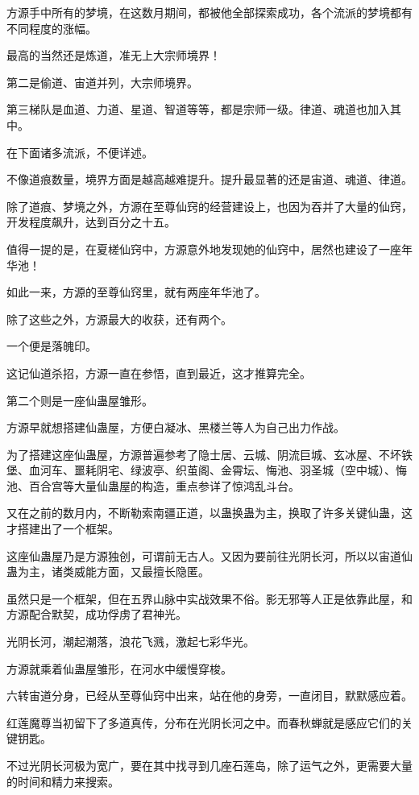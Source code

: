 \begin{this_body}
方源手中所有的梦境，在这数月期间，都被他全部探索成功，各个流派的梦境都有不同程度的涨幅。

最高的当然还是炼道，准无上大宗师境界！

第二是偷道、宙道并列，大宗师境界。

第三梯队是血道、力道、星道、智道等等，都是宗师一级。律道、魂道也加入其中。

在下面诸多流派，不便详述。

不像道痕数量，境界方面是越高越难提升。提升最显著的还是宙道、魂道、律道。

除了道痕、梦境之外，方源在至尊仙窍的经营建设上，也因为吞并了大量的仙窍，开发程度飙升，达到百分之十五。

值得一提的是，在夏槎仙窍中，方源意外地发现她的仙窍中，居然也建设了一座年华池！

如此一来，方源的至尊仙窍里，就有两座年华池了。

除了这些之外，方源最大的收获，还有两个。

一个便是落魄印。

这记仙道杀招，方源一直在参悟，直到最近，这才推算完全。

第二个则是一座仙蛊屋雏形。

方源早就想搭建仙蛊屋，方便白凝冰、黑楼兰等人为自己出力作战。

为了搭建这座仙蛊屋，方源普遍参考了隐士居、云城、阴流巨城、玄冰屋、不坏铁堡、血河车、噩耗阴宅、绿波亭、织茧阁、金霄坛、悔池、羽圣城（空中城）、悔池、百合宫等大量仙蛊屋的构造，重点参详了惊鸿乱斗台。

又在之前的数月内，不断勒索南疆正道，以蛊换蛊为主，换取了许多关键仙蛊，这才搭建出了一个框架。

这座仙蛊屋乃是方源独创，可谓前无古人。又因为要前往光阴长河，所以以宙道仙蛊为主，诸类威能方面，又最擅长隐匿。

虽然只是一个框架，但在五界山脉中实战效果不俗。影无邪等人正是依靠此屋，和方源配合默契，成功俘虏了君神光。

光阴长河，潮起潮落，浪花飞溅，激起七彩华光。

方源就乘着仙蛊屋雏形，在河水中缓慢穿梭。

六转宙道分身，已经从至尊仙窍中出来，站在他的身旁，一直闭目，默默感应着。

红莲魔尊当初留下了多道真传，分布在光阴长河之中。而春秋蝉就是感应它们的关键钥匙。

不过光阴长河极为宽广，要在其中找寻到几座石莲岛，除了运气之外，更需要大量的时间和精力来搜索。


\end{this_body}
